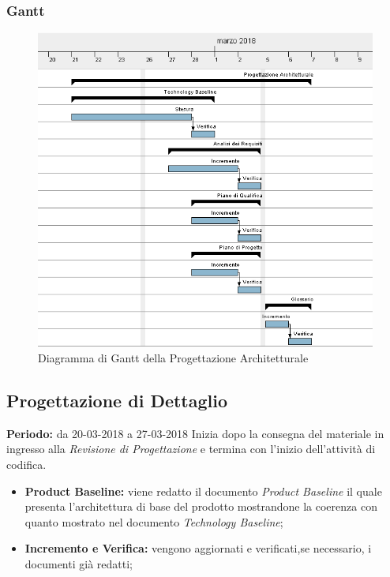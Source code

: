 \subsubsection{Gantt}
\begin{figure}[H]
	\centering 
	\includegraphics[width=1\textwidth]{images/Progettazione-Architetturale.png}
	\caption{Diagramma di Gantt della Progettazione Architetturale}
	\label{graficobello3} 
\end{figure}
\subsection{Progettazione di Dettaglio}
    \textbf{Periodo:} da 20-03-2018 a 27-03-2018\Spazio
    Inizia dopo la consegna del materiale in ingresso alla \emph{Revisione di Progettazione} e termina con l'inizio dell'attività di codifica.
    \begin{itemize}
    	\item \textbf{Product Baseline:} viene redatto il documento \emph{Product Baseline} il quale presenta l'architettura di base del prodotto mostrandone la coerenza con quanto mostrato nel documento \emph{Technology Baseline};
    	\item \textbf{Incremento e Verifica:} vengono aggiornati e verificati,se necessario, i documenti già redatti;
    \end{itemize}
